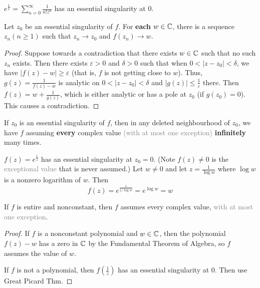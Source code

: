 \documentclass[12pt]{article}
\begin{document}
\eg $e^{\frac{1}{x}} = \sum_{n=0}^{\infty}\frac{1}{n!z^n}$ has an essential singularity at $0$.

\begin{theorem}
    Let $z_0$ be an essential singularity of $f$. For \textbf{each} $w\in \mathbb{C}$, there is a sequence $z_n (n\geq 1)$ such that $z_n\to z_0$ and $f(z_n)\to w$.
\end{theorem}
\begin{proof}
    Suppose towards a contradiction that there exists $w\in \mathbb{C}$ such that no such $z_n$ exists. Then there exists $\varepsilon>0$ and $\delta>0$ such that when $0<|z-z_0|<\delta$, we have $|f(z)-w|\geq \varepsilon$ (that is, $f$ is not getting close to $w$). Thus, $g(z)=\frac{1}{f(z)-w}$ is analytic on $0<|z-z_0|<\delta$ and $|g(z)|\leq \frac{1}{\varepsilon}$ there.  Then $f(z)=w+\frac{1}{g(z)}$, which is either analytic or has a pole at $z_0$ (if $g(z_0)=0$). This causes a contradiction.
\end{proof}

\begin{theorem}
    If $z_0$ is an essential singularity of $f$, then in any deleted neighbourhood of $z_0$, we have $f$ assuming \textbf{every} complex value \textcolor{gray}{(with at most one exception)} \textbf{infinitely} many times.
\end{theorem}

\eg $f(z)=e^{\frac{1}{z}}$ has an essential singularity at $z_0=0$. (Note $f(z)\neq 0$ is the \textcolor{gray}{exceptional value} that is never assumed.) Let $w\neq 0$ and let $z=\frac{1}{\log w}$ where $\log w$ is a nonzero logarithm of $w$. Then \[f(z)=e^{\frac{1}{1/\log w}}=e^{\log w}=w\]


\begin{theorem}
    If $f$ is entire and nonconstant, then $f$ assumes every complex value, \textcolor{gray}{with at most one exception}.
\end{theorem}
\begin{proof}
    If $f$ is a nonconstant polynomial and $w\in \mathbb{C}$, then the polynomial $f(z)-w$ has a zero in $\mathbb{C}$ by the Fundamental Theorem of Algebra, so $f$ assumes the value of $w$.

    If $f$ is not a polynomial, then $f(\frac{1}{z})$ has an essential singularity at $0$. Then use Great Picard Thm.
\end{proof}
\end{document}
